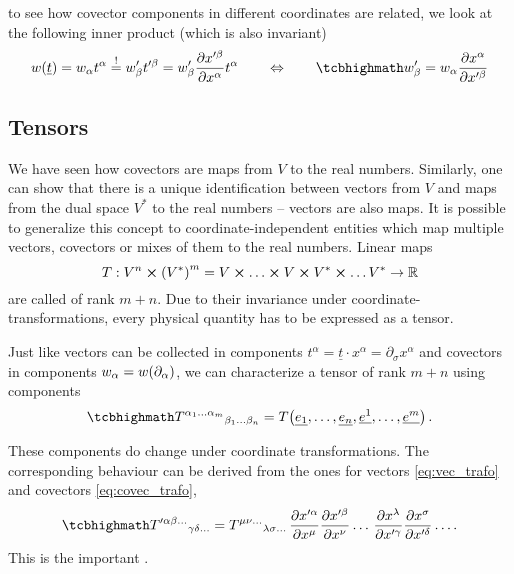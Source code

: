 \documentclass[ART_main.tex]{subfiles}
\begin{document}
to see how covector components in different coordinates are related, we look at the following inner product (which is also invariant)
\begin{equation}\label{eq:covec_trafo}
w\qty(\underline{t}) = w_\alpha t^\alpha \overset{!}{=} w'_\beta t'^\beta = w'_\beta \pdv{x'^\beta}{x^\alpha} t^\alpha
\qquad \Leftrightarrow \qquad
\eqbox{
w'_\beta = w_\alpha \pdv{x^\alpha}{x'^\beta}
}
\end{equation}



		\subsection{Tensors}
We have seen how covectors are maps from $V$ to the real numbers. Similarly, one can show that there is a unique identification between vectors from $V$ and maps from the dual space $V^*$ to the real numbers -- vectors are also maps. It is possible to generalize this concept to coordinate-independent entities which map multiple vectors, covectors or mixes of them to the real numbers. Linear maps
\begin{equation}
T: V^n \cross \qty(V^*)^m = V \cross \dots \cross V \cross V^* \cross \dots V^* \rightarrow \mathbb{R}
\end{equation}
are called  of rank $m + n$. Due to their invariance under coordinate-transformations, every physical quantity has to be expressed as a tensor.

Just like vectors can be collected in components $t^\alpha = \underline{t} \cdot x^\alpha = \partial_\sigma x^\alpha$ and covectors in components $w_\alpha = w\qty(\partial_\alpha)$, we can characterize a tensor of rank $m + n$ using components
\begin{equation}
\eqbox{
T^{\alpha_1 \dots \alpha_m}{}_{\beta_1 \dots \beta_n} = T\qty(\underline{e_1}, \dots, \underline{e_n}, \underline{e^1}, \dots, \underline{e^m})
} \, .
\end{equation}

These components do change under coordinate transformations. The corresponding behaviour can be derived from the ones for vectors \eqref{eq:vec_trafo} and covectors \eqref{eq:covec_trafo},
\begin{equation}
\eqbox{
T'^{\alpha \beta \dots}{}_{\gamma \delta \dots} = T^{\mu \nu \dots}{}_{\lambda \sigma \dots} \, \pdv{x'^\alpha}{x^\mu} \pdv{x'^\beta}{x^\nu} \dots \, \pdv{x^\lambda}{x'^\gamma} \pdv{x^\sigma}{x'^\delta} \dots
} \, .
\end{equation}
This is the important .\\
\end{document}
